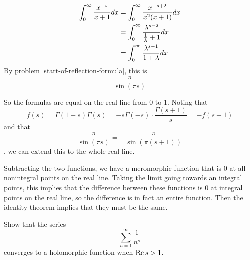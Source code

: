 \documentclass{homework}
\begin{document}
\begin{solution}
                                                              \begin{align*}
                                                              \int_0^\infty \frac{x^{-s}}{x+1} dx &=
                                                              \int_0^\infty \frac{x^{-s+2}}{x^2(x+1)} dx\\
                                                              &= \int_0^\infty \frac{\lambda^{s-2}}{\frac{1}{\lambda}+1} dx\\
                                                              &= \int_0^\infty \frac{\lambda^{s-1}}{1 + \lambda} dx
                                                              \end{align*}
                                                              By problem \ref{start-of-reflection-formula}, this is \[\frac{\pi}{\sin(\pi s)}\]

                                                              So the formulas are equal on the real line from $0$ to $1$. Noting that
                                                              \[
                                                              f(s) = \Gamma(1-s)\Gamma(s) = -s\Gamma(-s) \cdot \frac{\Gamma(s+1)}{s} = -f(s+1)
                                                              \]
                                                              and that 
                                                              \[
                                                              \frac{\pi}{\sin(\pi s)} = -\frac{\pi}{\sin(\pi (s+1))} \], we can extend this to the whole real line.

                                                              Subtracting the two functions, we have a meromorphic function that is 0 at all nonintegral points on the real line. Taking the limit going towards an integral points, this implies that the difference between these functions is 0 at integral points on the real line, so the difference is in fact an entire function. Then the identity theorem implies that they must be the same. 
                                                              \end{solution}
                                                              \begin{problem}
                                                                Show that the series
                                                                  \[\displaystyle\sum_{n=1}^\infty \displaystyle\frac {1}{n^{s}}\]
                                                                    converges to a holomorphic function when $\operatorname{Re} s > 1$.
                                                                    \end{problem}
\end{document}
